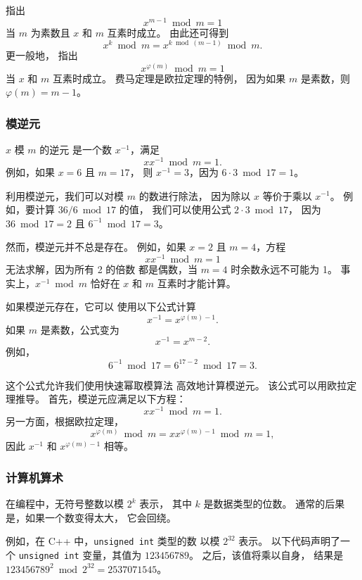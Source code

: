 
指出
\[x^{m-1} \bmod m = 1\]
当 $m$ 为素数且 $x$ 和 $m$ 互素时成立。
由此还可得到
\[x^k \bmod m = x^{k \bmod (m-1)} \bmod m.\]
更一般地，
指出
\[x^{\varphi(m)} \bmod m = 1\]
当 $x$ 和 $m$ 互素时成立。
费马定理是欧拉定理的特例，
因为如果 $m$ 是素数，则 $\varphi(m)=m-1$。

\subsubsection{模逆元}


$x$ 模 $m$ 的逆元
是一个数 $x^{-1}$，满足
\[ x x^{-1} \bmod m = 1. \]
例如，如果 $x=6$ 且 $m=17$，
则 $x^{-1}=3$，因为 $6\cdot3 \bmod 17=1$。

利用模逆元，我们可以对模 $m$ 的数进行除法，
因为除以 $x$
等价于乘以 $x^{-1}$。
例如，要计算 $36/6 \bmod 17$ 的值，
我们可以使用公式 $2 \cdot 3 \bmod 17$，
因为 $36 \bmod 17 = 2$ 且 $6^{-1} \bmod 17 = 3$。

然而，模逆元并不总是存在。
例如，如果 $x=2$ 且 $m=4$，方程
\[ x x^{-1} \bmod m = 1 \]
无法求解，因为所有 2 的倍数
都是偶数，当 $m=4$ 时余数永远不可能为 1。
事实上，$x^{-1} \bmod m$
恰好在 $x$ 和 $m$ 互素时才能计算。

如果模逆元存在，它可以
使用以下公式计算
\[
x^{-1} = x^{\varphi(m)-1}.
\]
如果 $m$ 是素数，公式变为
\[
x^{-1} = x^{m-2}.
\]
例如，
\[6^{-1} \bmod 17 =6^{17-2} \bmod 17 = 3.\]

这个公式允许我们使用快速幂取模算法
高效地计算模逆元。
该公式可以用欧拉定理推导。
首先，模逆元应满足以下方程：
\[
x x^{-1} \bmod m = 1.
\]
另一方面，根据欧拉定理，
\[
x^{\varphi(m)} \bmod m =  xx^{\varphi(m)-1} \bmod m = 1,
\]
因此 $x^{-1}$ 和 $x^{\varphi(m)-1}$ 相等。

\subsubsection{计算机算术}

在编程中，无符号整数以模 $2^k$ 表示，
其中 $k$ 是数据类型的位数。
通常的后果是，如果一个数变得太大，
它会回绕。

例如，在 C++ 中，\texttt{unsigned int} 类型的数
以模 $2^{32}$ 表示。
以下代码声明了一个 \texttt{unsigned int}
变量，其值为 $123456789$。
之后，该值将乘以自身，
结果是
$123456789^2 \bmod 2^{32} = 2537071545$。

